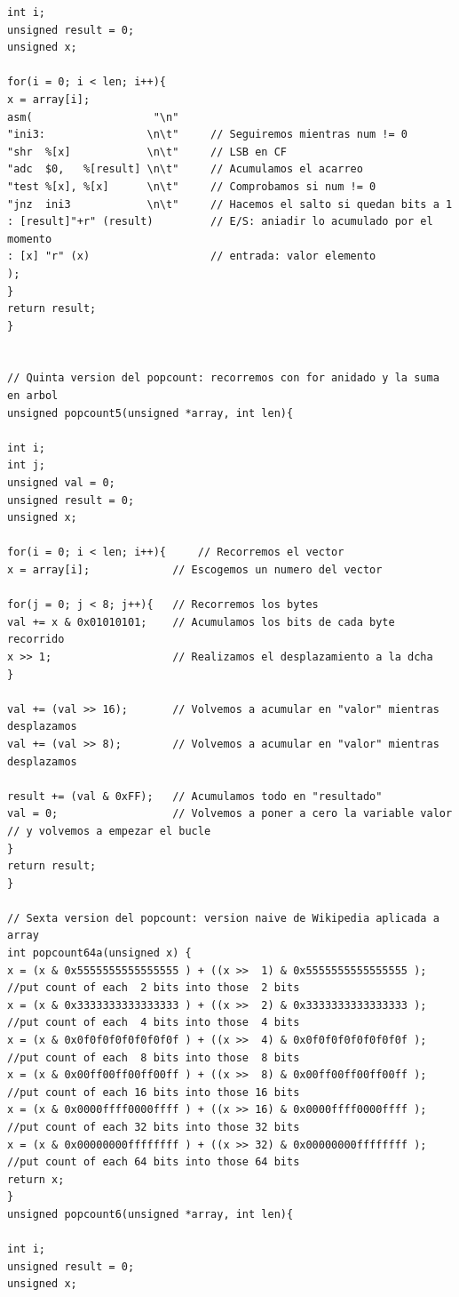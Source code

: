 \begin{lstlisting}[frame=single]
int i;
unsigned result = 0;
unsigned x;

for(i = 0; i < len; i++){
x = array[i];
asm( 				   "\n"
"ini3:				  \n\t"	   	// Seguiremos mientras num != 0
"shr  %[x]			  \n\t"	   	// LSB en CF
"adc  $0, 	%[result] \n\t"	   	// Acumulamos el acarreo
"test %[x], %[x]	  \n\t"	   	// Comprobamos si num != 0
"jnz  ini3			  \n\t"	   	// Hacemos el salto si quedan bits a 1
: [result]"+r" (result)			// E/S: aniadir lo acumulado por el momento
: [x] "r" (x)  			   		// entrada: valor elemento
);
}
return result;
}


// Quinta version del popcount: recorremos con for anidado y la suma en arbol
unsigned popcount5(unsigned *array, int len){

int i;
int j;
unsigned val = 0;
unsigned result = 0;
unsigned x;

for(i = 0; i < len; i++){     // Recorremos el vector
x = array[i];			  // Escogemos un numero del vector

for(j = 0; j < 8; j++){	  // Recorremos los bytes
val += x & 0x01010101;	  // Acumulamos los bits de cada byte recorrido
x >> 1;					  // Realizamos el desplazamiento a la dcha
}

val += (val >> 16);		  // Volvemos a acumular en "valor" mientras desplazamos
val += (val >> 8);		  // Volvemos a acumular en "valor" mientras desplazamos

result += (val & 0xFF);   // Acumulamos todo en "resultado"
val = 0; 			 	  // Volvemos a poner a cero la variable valor
// y volvemos a empezar el bucle
}
return result;
}

// Sexta version del popcount: version naive de Wikipedia aplicada a array
int popcount64a(unsigned x) {     
x = (x & 0x5555555555555555 ) + ((x >>  1) & 0x5555555555555555 ); //put count of each  2 bits into those  2 bits      
x = (x & 0x3333333333333333 ) + ((x >>  2) & 0x3333333333333333 ); //put count of each  4 bits into those  4 bits     
x = (x & 0x0f0f0f0f0f0f0f0f ) + ((x >>  4) & 0x0f0f0f0f0f0f0f0f ); //put count of each  8 bits into those  8 bits      
x = (x & 0x00ff00ff00ff00ff ) + ((x >>  8) & 0x00ff00ff00ff00ff ); //put count of each 16 bits into those 16 bits      
x = (x & 0x0000ffff0000ffff ) + ((x >> 16) & 0x0000ffff0000ffff ); //put count of each 32 bits into those 32 bits      
x = (x & 0x00000000ffffffff ) + ((x >> 32) & 0x00000000ffffffff ); //put count of each 64 bits into those 64 bits      
return x; 
} 
unsigned popcount6(unsigned *array, int len){

int i;
unsigned result = 0;
unsigned x;


\end{lstlisting}
